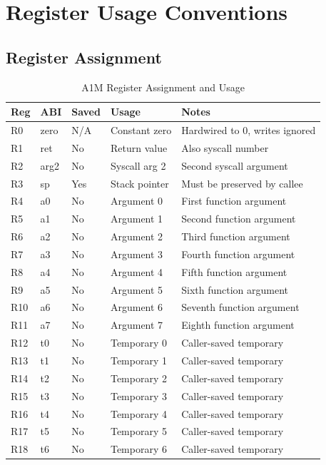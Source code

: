 \documentclass[12pt,a4paper,oneside]{book}
\begin{document}
\chapter{Register Usage Conventions}

\section{Register Assignment}

\begin{table}[H]
\centering
\caption{A1M Register Assignment and Usage}
\label{tab:register-assignment}
\begin{tabularx}{\textwidth}{|l|l|l|l|X|}
\hline
\textbf{Reg} & \textbf{ABI} & \textbf{Saved} & \textbf{Usage} & \textbf{Notes} \\
\hline
R0 & zero & N/A & Constant zero & Hardwired to 0, writes ignored \\
R1 & ret & No & Return value & Also syscall number \\
R2 & arg2 & No & Syscall arg 2 & Second syscall argument \\
R3 & sp & Yes & Stack pointer & Must be preserved by callee \\
R4 & a0 & No & Argument 0 & First function argument \\
R5 & a1 & No & Argument 1 & Second function argument \\
R6 & a2 & No & Argument 2 & Third function argument \\
R7 & a3 & No & Argument 3 & Fourth function argument \\
R8 & a4 & No & Argument 4 & Fifth function argument \\
R9 & a5 & No & Argument 5 & Sixth function argument \\
R10 & a6 & No & Argument 6 & Seventh function argument \\
R11 & a7 & No & Argument 7 & Eighth function argument \\
R12 & t0 & No & Temporary 0 & Caller-saved temporary \\
R13 & t1 & No & Temporary 1 & Caller-saved temporary \\
R14 & t2 & No & Temporary 2 & Caller-saved temporary \\
R15 & t3 & No & Temporary 3 & Caller-saved temporary \\
R16 & t4 & No & Temporary 4 & Caller-saved temporary \\
R17 & t5 & No & Temporary 5 & Caller-saved temporary \\
R18 & t6 & No & Temporary 6 & Caller-saved temporary \\

\end{tabularx}
\end{table}
\end{document}

